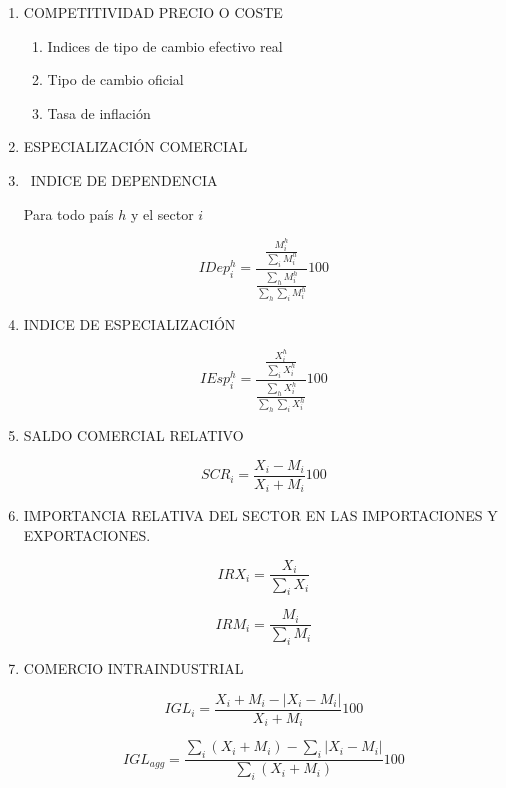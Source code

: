 \documentclass[a4paper,openright,12pt]{book}
\begin{document}
\begin{enumerate}
    \item COMPETITIVIDAD PRECIO O COSTE
    \begin{enumerate}
        \item Indices de tipo de cambio efectivo real
        \item Tipo de cambio oficial
        \item Tasa de inflación
    \end{enumerate}

\item ESPECIALIZACIÓN COMERCIAL

\item  INDICE DE DEPENDENCIA

Para todo país $h$ y el sector $i$

$$IDep^h_i = \frac{\frac{M^h_i}{\sum_i M^h_i}}{\frac{\sum_h M^h_i}{\sum_h \sum_i M^h_i}} 100$$

\item  INDICE DE ESPECIALIZACIÓN

$$IEsp^h_i = \frac{\frac{X^h_i}{\sum_i X^h_i}}{\frac{\sum_h X^h_i}{\sum_h \sum_i X^h_i}} 100$$

\item  SALDO COMERCIAL RELATIVO

$$SCR_i = \frac{X_i - M_i}{X_i + M_i} 100$$

\item IMPORTANCIA RELATIVA DEL SECTOR EN LAS IMPORTACIONES Y EXPORTACIONES.

$$IRX_i = \frac{X_i}{\sum_i X_i}$$

$$IRM_i = \frac{M_i}{\sum_i M_i}$$

\item COMERCIO INTRAINDUSTRIAL

$$IGL_i = \frac{X_i + M_i - |X_i - M_i|}{X_i + M_i}100$$

$$IGL_{agg} = \frac{\sum_i(X_i + M_i) - \sum_i |X_i - M_i|}{\sum_i (X_i + M_i)}100$$

\end{enumerate}


\cleardoublepage
{}

\end{document}
